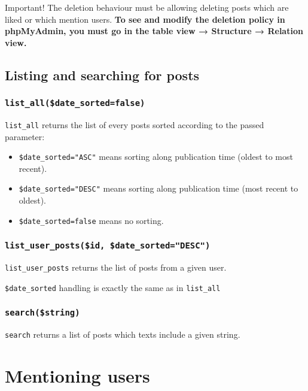 \documentclass[twoside,a4paper,12pt]{article}
\begin{document}
\begin{bclogo}[logo=\bcattention, noborder=true, barre=none]{Important!}
	The deletion behaviour must be allowing deleting posts which are liked or which mention users. \textbf{To see and modify the deletion policy in phpMyAdmin, you must go in the table view → Structure → Relation view.}
		
\end{bclogo}

\subsection{Listing and searching for posts}

\subsubsection{\texttt{list\_all(\$date\_sorted=false)}}

\texttt{list\_all} returns the list of every posts sorted according to the passed parameter:

\begin{itemize}
\item \texttt{\$date\_sorted="ASC"} means sorting along publication time (oldest to most recent).
\item \texttt{\$date\_sorted="DESC"} means sorting along publication time (most recent to oldest).
\item \texttt{\$date\_sorted=false} means no sorting.
\end{itemize}

\subsubsection{\texttt{list\_user\_posts(\$id, \$date\_sorted="DESC")}}

\texttt{list\_user\_posts} returns the list of posts from a given user.

\texttt{\$date\_sorted} handling is exactly the same as in \texttt{list\_all}

\subsubsection{\texttt{search(\$string)}}

\texttt{search} returns a list of posts which texts include a given string.

\section{Mentioning users}
\end{document}
